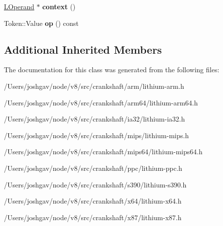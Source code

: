 \begin{DoxyCompactItemize}
\item 
\hyperlink{classv8_1_1internal_1_1_l_operand}{L\+Operand} $\ast$ {\bfseries context} ()\hypertarget{classv8_1_1internal_1_1_l_cmp_t_a0beea53d13e064416006b17596aae2a1}{}\label{classv8_1_1internal_1_1_l_cmp_t_a0beea53d13e064416006b17596aae2a1}

\item 
Token\+::\+Value {\bfseries op} () const \hypertarget{classv8_1_1internal_1_1_l_cmp_t_affeb8a538e036a9115089631b13671f8}{}\label{classv8_1_1internal_1_1_l_cmp_t_affeb8a538e036a9115089631b13671f8}

\end{DoxyCompactItemize}
\subsection*{Additional Inherited Members}


The documentation for this class was generated from the following files\+:\begin{DoxyCompactItemize}
\item 
/\+Users/joshgav/node/v8/src/crankshaft/arm/lithium-\/arm.\+h\item 
/\+Users/joshgav/node/v8/src/crankshaft/arm64/lithium-\/arm64.\+h\item 
/\+Users/joshgav/node/v8/src/crankshaft/ia32/lithium-\/ia32.\+h\item 
/\+Users/joshgav/node/v8/src/crankshaft/mips/lithium-\/mips.\+h\item 
/\+Users/joshgav/node/v8/src/crankshaft/mips64/lithium-\/mips64.\+h\item 
/\+Users/joshgav/node/v8/src/crankshaft/ppc/lithium-\/ppc.\+h\item 
/\+Users/joshgav/node/v8/src/crankshaft/s390/lithium-\/s390.\+h\item 
/\+Users/joshgav/node/v8/src/crankshaft/x64/lithium-\/x64.\+h\item 
/\+Users/joshgav/node/v8/src/crankshaft/x87/lithium-\/x87.\+h\end{DoxyCompactItemize}
